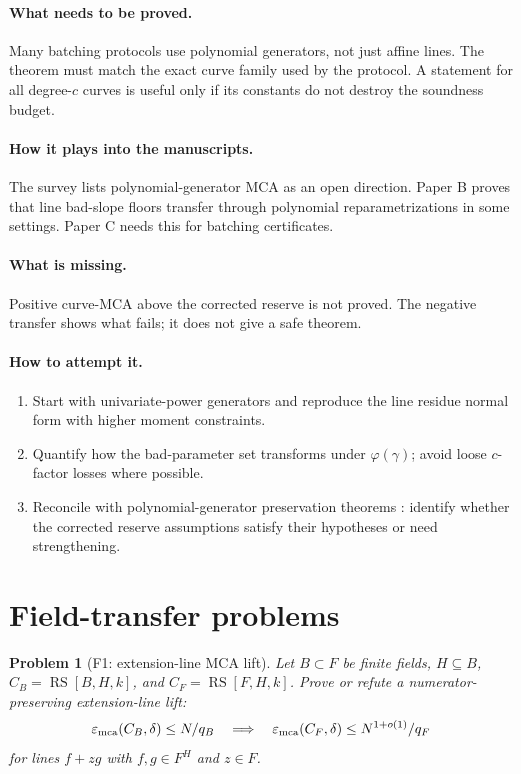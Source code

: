 \documentclass[11pt]{article}
\newtheorem{problem}[theorem]{Problem}
\theoremstyle{definition}
\theoremstyle{remark}
\newcommand{\RS}{\operatorname{RS}}
\newcommand{\emca}{\varepsilon_{\rm mca}}
\newcommand{\paperB}{Paper B}
\newcommand{\paperC}{Paper C}
\begin{document}
\paragraph{What needs to be proved.}  Many batching protocols use polynomial generators, not just affine lines.  The theorem must match the exact curve family used by the protocol.  A statement for all degree-$c$ curves is useful only if its constants do not destroy the soundness budget.

\paragraph{How it plays into the manuscripts.}  The survey lists polynomial-generator MCA as an open direction.  \paperB{} proves that line bad-slope floors transfer through polynomial reparametrizations in some settings.  \paperC{} needs this for batching certificates.

\paragraph{What is missing.}  Positive curve-MCA above the corrected reserve is not proved.  The negative transfer shows what fails; it does not give a safe theorem.

\paragraph{How to attempt it.}
\begin{enumerate}[leftmargin=2.2em]
\item Start with univariate-power generators and reproduce the line residue normal form with higher moment constraints.
\item Quantify how the bad-parameter set transforms under $\varphi(\gamma)$; avoid loose $c$-factor losses where possible.
\item Reconcile with polynomial-generator preservation theorems \cite{BCGM25}: identify whether the corrected reserve assumptions satisfy their hypotheses or need strengthening.
\end{enumerate}

\section{Field-transfer problems}
\label{sec:field-problems}

\begin{problem}[F1: extension-line MCA lift]
\label{prob:F1}
Let $B\subset F$ be finite fields, $H\subseteq B$, $C_B=\RS[B,H,k]$, and $C_F=\RS[F,H,k]$.  Prove or refute a numerator-preserving extension-line lift:
\[
        \emca(C_B,\delta)\le N/q_B
        \quad\Longrightarrow\quad
        \emca(C_F,\delta)\le N^{1+o(1)}/q_F
\]
for lines $f+zg$ with $f,g\in F^H$ and $z\in F$.
\end{problem}
\end{document}
